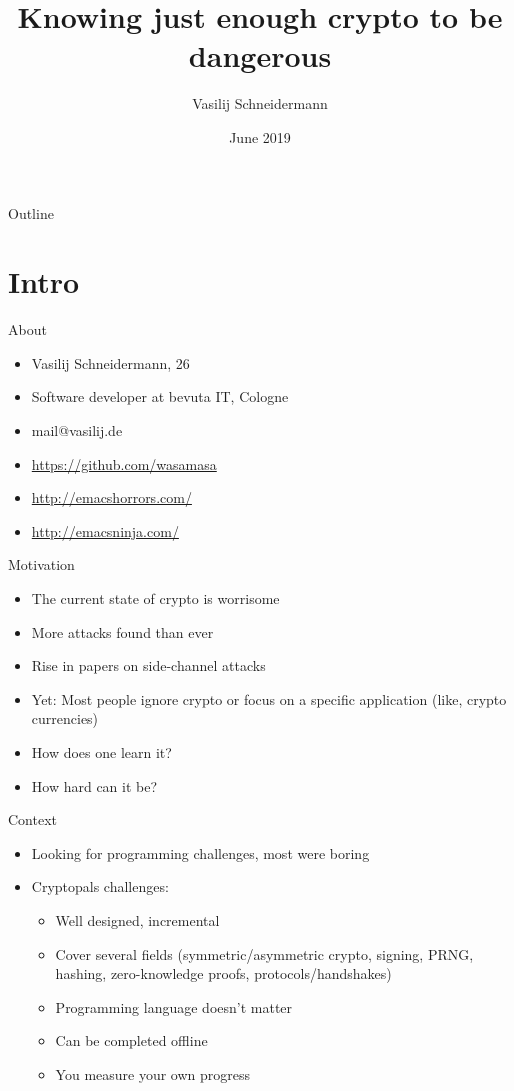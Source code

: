 \documentclass[presentation]{beamer}
\author{Vasilij Schneidermann}
\date{June 2019}
\title{Knowing just enough crypto to be dangerous}
\begin{document}
\maketitle
\begin{frame}{Outline}
\tableofcontents
\end{frame}

\AtBeginSection{\frame{\sectionpage}}

\section{Intro}
\label{sec:org566d422}

\begin{frame}[label={sec:org1d30ba4}]{About}
\begin{itemize}
\item Vasilij Schneidermann, 26
\item Software developer at bevuta IT, Cologne
\item mail@vasilij.de
\item \url{https://github.com/wasamasa}
\item \url{http://emacshorrors.com/}
\item \url{http://emacsninja.com/}
\end{itemize}
\end{frame}

\begin{frame}[label={sec:org583030f}]{Motivation}
\begin{itemize}
\item The current state of crypto is worrisome
\item More attacks found than ever
\item Rise in papers on side-channel attacks
\item Yet: Most people ignore crypto or focus on a specific application
(like, crypto currencies)
\item How does one learn it?
\item How hard can it be?
\end{itemize}
\end{frame}

\begin{frame}[label={sec:org36fe053}]{Context}
\begin{itemize}
\item Looking for programming challenges, most were boring
\item Cryptopals challenges:
\begin{itemize}
\item Well designed, incremental
\item Cover several fields (symmetric/asymmetric crypto, signing, PRNG,
hashing, zero-knowledge proofs, protocols/handshakes)
\item Programming language doesn't matter
\item Can be completed offline
\item You measure your own progress
\end{itemize}
\end{itemize}
\end{frame}
\end{document}

